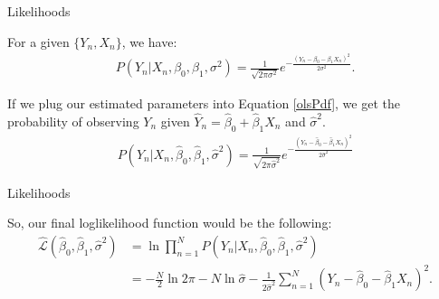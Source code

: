 \documentclass{beamer}\usepackage[]{graphicx}\usepackage[]{color}
\begin{document}
\watermarkon %

\begin{frame}{Likelihoods}
  
  For a given $\{Y_n, X_n\}$, we have:
  \begin{align}
    P \left( Y_n|X_n, \beta_0, \beta_1, \sigma^2 \right) = 
    \frac{1}{\sqrt{2 \pi \sigma^2}} 
    e^{-\frac{\left( Y_n - \beta_0 - \beta_1 X_n \right)^2}{2\sigma^2}}. \label{olsPdf}
  \end{align}
  
  If we plug our estimated parameters into Equation \ref{olsPdf}, we get the 
  probability of observing $Y_n$ given $\hat{Y}_n = \hat{\beta}_0 + 
  \hat{\beta}_1X_n$ and $\hat{\sigma}^2$.
  \begin{align}
    P \left( Y_n|X_n, \hat{\beta}_0, \hat{\beta}_1, \hat{\sigma}^2 \right) = 
    \frac{1}{\sqrt{2 \pi \hat{\sigma}^2}} 
    e^{-\frac{\left( Y_n - \hat{\beta}_0 - \hat{\beta}_1 X_n \right)^2}{2\hat{\sigma}^2}} \label{estOlsPdf}
  \end{align}
  
\end{frame}


\begin{frame}{Likelihoods}
 
  So, our final loglikelihood function would be the following:
  \begin{align*}
  \hat{\mathcal{L}} \left( \hat{\beta}_0, \hat{\beta}_1, \hat{\sigma}^2 \right) &= 
    \ln \prod_{n = 1}^N P \left( Y_n|X_n, \hat{\beta}_0, \hat{\beta}_1, \hat{\sigma}^2 \right)\\ 
    &= -\frac{N}{2} \ln 2\pi - N \ln \hat{\sigma} - \frac{1}{2\hat{\sigma}^2} 
    \sum_{n = 1}^N \left( Y_n - \hat{\beta}_0 - \hat{\beta}_1 X_n \right)^2.
  \end{align*}
  
\end{frame}
  
\watermarkoff %
\end{document}
